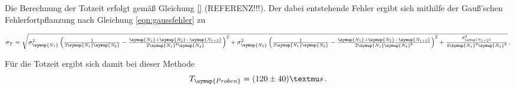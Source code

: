 Die Berechnung der Totzeit erfolgt gemäß Gleichung \eqref{} (REFERENZ!!!). Der dabei
entstehende Fehler ergibt sich mithilfe der Gauß'schen Fehlerfortpflanzung
nach Gleichung \eqref{eqn:gaussfehler} zu
\begin{center}
  $\sigma_T = \sqrt{\sigma_{\symup{N_1}}^{2} \left(\frac{1}{2 \symup{N_1} \symup{N_2}}
  - \frac{\symup{N_1} + \symup{N_2} - \symup{N_{1+2}}}{2 \symup{N_1}^{2} \symup{N_2}}\right)^{2}
  + \sigma_{\symup{N_2}}^{2} \left(\frac{1}{2 \symup{N_1} \symup{N_2}}
  - \frac{\symup{N_1} + \symup{N_2} - \symup{N_{1+2}}}{2 \symup{N_1} \symup{N_2}^{2}}\right)^{2}
  + \frac{\sigma_{\symup{N_{1+2}}}^{2}}{4 \symup{N_1}^{2} \symup{N_2}^{2}}} \,.$
\end{center}
Für die Totzeit ergibt sich damit bei dieser Methode
\begin{equation*}
  T_{\symup{Proben}}= (120 \pm 40)µs \,.
\end{equation*}

